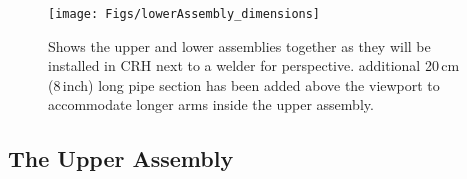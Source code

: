 
\begin{figure}[htbp]
 \centering
  \texttt{[image: Figs/lowerAssembly\_dimensions]}
  \caption{Shows the upper and lower assemblies together as they will be installed in CRH next to a welder for perspective. additional 20\,cm (8\,inch) long pipe section has been added above the viewport to accommodate longer arms inside the upper assembly. }
  \label{fig:lowerAssembly_dimensions}
\end{figure}



	
 \subsection{The Upper Assembly} \label{The Upper Assembly}
